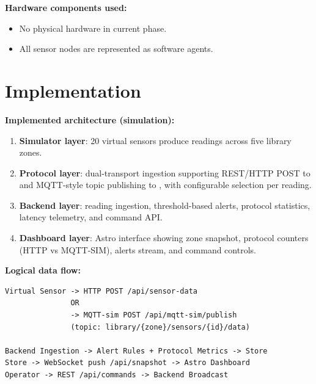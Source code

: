 \documentclass[12pt,a4paper]{article}
\begin{document}
\textbf{Hardware components used:}
\begin{itemize}[leftmargin=1.5em]
	\item No physical hardware in current phase.
	\item All sensor nodes are represented as software agents.
\end{itemize}

\section*{Implementation}
\textbf{Implemented architecture (simulation):}
\begin{enumerate}[leftmargin=1.5em]
	\item \textbf{Simulator layer}: 20 virtual sensors produce readings across five library zones.
	\item \textbf{Protocol layer}: dual-transport ingestion supporting REST/HTTP POST to  and MQTT-style topic publishing to , with configurable selection per reading.
	\item \textbf{Backend layer}: reading ingestion, threshold-based alerts, protocol statistics, latency telemetry, and command API.
	\item \textbf{Dashboard layer}: Astro interface showing zone snapshot, protocol counters (HTTP vs MQTT-SIM), alerts stream, and command controls.
\end{enumerate}

\textbf{Logical data flow:}
{\small
	\begin{verbatim}
Virtual Sensor -> HTTP POST /api/sensor-data
               OR
               -> MQTT-sim POST /api/mqtt-sim/publish
               (topic: library/{zone}/sensors/{id}/data)

Backend Ingestion -> Alert Rules + Protocol Metrics -> Store
Store -> WebSocket push /api/snapshot -> Astro Dashboard
Operator -> REST /api/commands -> Backend Broadcast
\end{verbatim}
}
\end{document}
